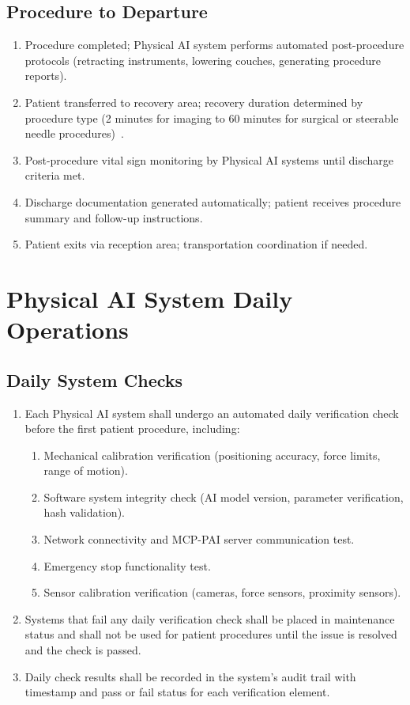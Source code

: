 \documentclass[11pt,letterpaper]{article}
\begin{document}
\subsection{Procedure to Departure}

\begin{enumerate}[label=(\alph*)]
\item Procedure completed; Physical AI system performs automated post-procedure
  protocols (retracting instruments, lowering couches, generating procedure
  reports).
\item Patient transferred to recovery area; recovery duration determined by
  procedure type (2 minutes for imaging to 60 minutes for surgical or
  steerable needle procedures)~\cite{patientinstructions2026}.
\item Post-procedure vital sign monitoring by Physical AI systems until
  discharge criteria met.
\item Discharge documentation generated automatically; patient receives
  procedure summary and follow-up instructions.
\item Patient exits via reception area; transportation coordination if needed.
\end{enumerate}

\section{Physical AI System Daily Operations}

\subsection{Daily System Checks}

\begin{enumerate}[label=(\alph*)]
\item Each Physical AI system shall undergo an automated daily verification
  check before the first patient procedure, including:
  \begin{enumerate}[label=(\arabic*)]
  \item Mechanical calibration verification (positioning accuracy, force
    limits, range of motion).
  \item Software system integrity check (AI model version, parameter
    verification, hash validation).
  \item Network connectivity and MCP-PAI server communication test.
  \item Emergency stop functionality test.
  \item Sensor calibration verification (cameras, force sensors, proximity
    sensors).
  \end{enumerate}

\item Systems that fail any daily verification check shall be placed in
  maintenance status and shall not be used for patient procedures until
  the issue is resolved and the check is passed.

\item Daily check results shall be recorded in the system's audit trail with
  timestamp and pass or fail status for each verification element.
\end{enumerate}
\end{document}
